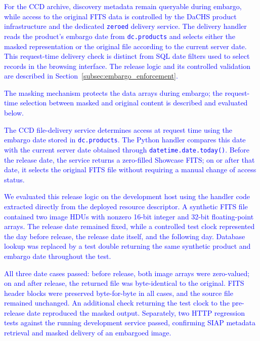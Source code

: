 \textcolor{blue}{For the CCD archive, discovery metadata remain queryable during embargo, while access to the original FITS data is controlled by the DaCHS product infrastructure and the dedicated \texttt{zeroed} delivery service. The delivery handler reads the product's embargo date from \texttt{dc.products} and selects either the masked representation or the original file according to the current server date. This request-time delivery check is distinct from SQL date filters used to select records in the browsing interface. The release logic and its controlled validation are described in Section~\ref{subsec:embargo_enforcement}.}

\textcolor{blue}{The masking mechanism protects the data arrays during embargo; the request-time selection between masked and original content is described and evaluated below.}

\textcolor{blue}{The CCD file-delivery service determines access at request time using the embargo date stored in \texttt{dc.products}. The Python handler compares this date with the current server date obtained through \texttt{datetime.date.today()}. Before the release date, the service returns a zero-filled Showcase FITS; on or after that date, it selects the original FITS file without requiring a manual change of access status.}

\textcolor{blue}{We evaluated this release logic on the development host using the handler code extracted directly from the deployed resource descriptor. A synthetic FITS file contained two image HDUs with nonzero 16-bit integer and 32-bit floating-point arrays. The release date remained fixed, while a controlled test clock represented the day before release, the release date itself, and the following day. Database lookup was replaced by a test double returning the same synthetic product and embargo date throughout the test.}

\textcolor{blue}{All three date cases passed: before release, both image arrays were zero-valued; on and after release, the returned file was byte-identical to the original. FITS header blocks were preserved byte-for-byte in all cases, and the source file remained unchanged. An additional check returning the test clock to the pre-release date reproduced the masked output. Separately, two HTTP regression tests against the running development service passed, confirming SIAP metadata retrieval and masked delivery of an embargoed image.}

